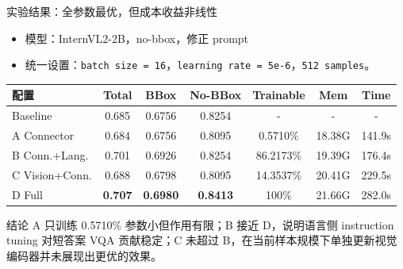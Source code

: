 \documentclass{beamer}
\newcommand{\smalltab}{\scriptsize}
\begin{document}
\begin{frame}{实验结果：全参数最优，但成本收益非线性}
\small
\begin{itemize}
\item 模型：InternVL2-2B，no-bbox，修正 prompt
\item 统一设置：\texttt{batch size = 16}，\texttt{learning rate = 5e-6}，\texttt{512 samples}。
\end{itemize}
\centering
\smalltab
\begin{tabular}{p{}cccccc}
\toprule
配置 & Total & BBox & No-BBox & Trainable & Mem & Time \\
\midrule
Baseline & 0.685 & 0.6756 & 0.8254 & - & - & - \\
A Connector & 0.684 & 0.6756 & 0.8095 & 0.5710\% & 18.38G & 141.9s \\
B Conn.+Lang. & 0.701 & 0.6926 & 0.8254 & 86.2173\% & 19.39G & 176.4s \\
C Vision+Conn. & 0.688 & 0.6798 & 0.8095 & 14.3537\% & 20.41G & 229.5s \\
D Full & \textbf{0.707} & \textbf{0.6980} & \textbf{0.8413} & 100\% & 21.66G & 282.0s \\
\bottomrule
\end{tabular}
\vspace{0.3em}
\begin{block}{结论}
A 只训练 0.5710\% 参数小但作用有限；B 接近 D，说明语言侧 instruction tuning 对短答案 VQA 贡献稳定；C 未超过 B，在当前样本规模下单独更新视觉编码器并未展现出更优的效果。
\end{block}
\end{frame}
\end{document}
